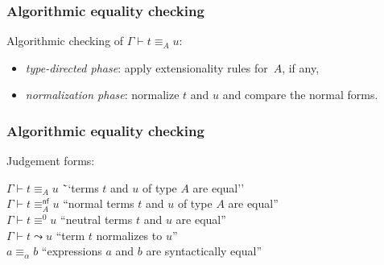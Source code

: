 \documentclass[10pt]{beamer}
\newcommand{\types}{\vdash} %
\newcommand{\nfequiv}{\equiv^\mathsf{nf}}
\newcommand{\neutequiv}{\equiv^0}
\newcommand{\norm}{\leadsto}
\begin{document}
\begin{frame}
  \frametitle{Algorithmic equality checking}

  Algorithmic checking of $\Gamma \types t \equiv_A u$:
  \begin{itemize}
  \item \emph{type-directed phase}: apply extensionality rules for~$A$, if any,
  \item \emph{normalization phase}: normalize $t$ and $u$ and compare the normal forms.
  \end{itemize}
\end{frame}

\begin{frame}
  \frametitle{Algorithmic equality checking}

  Judgement forms:
  \begin{tabbing}
    $\Gamma \vdash t \equiv_A u$ \qquad\quad\= ``terms $t$ and $u$ of type $A$ are equal'' \\
    $\Gamma \vdash t \nfequiv_A u$ \> ``normal terms $t$ and $u$ of type $A$ are equal'' \\
    $\Gamma \vdash t \neutequiv u $ \> ``neutral terms $t$ and $u$ are equal'' \\
    $\Gamma \vdash t \norm u$ \> ``term $t$ normalizes to $u$'' \\
    $a \equiv_\alpha b$ \> ``expressions $a$ and $b$ are syntactically equal''
  \end{tabbing}
\end{frame}
\end{document}
